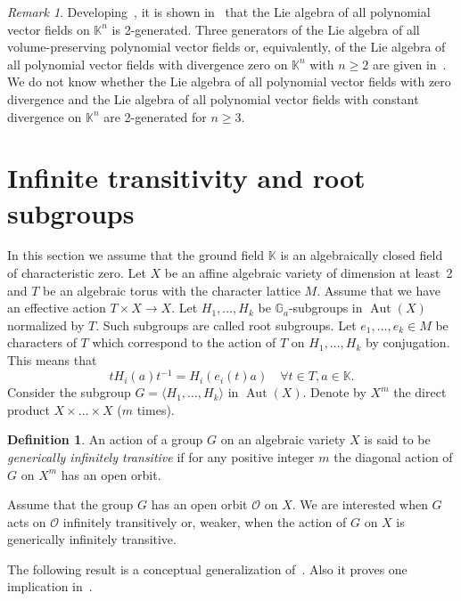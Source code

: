 \documentclass[a4paper,draft,reqno,12pt]{amsart}
\theoremstyle{definition}
\newtheorem{definition}[theorem]{Definition}
\theoremstyle{remark}
\newtheorem {remark}[theorem]{Remark}
\DeclareMathOperator{\Aut}{Aut}
\def\GG{{\mathbb G}}
\def\KK{{\mathbb K}}
\def\OOO{\mathcal{O}}
\renewcommand{\ge}{\geqslant}
\begin{document}
\begin{remark}
Developing~\cite[Theorem~11]{An-1}, it is shown in~\cite{Be} that the Lie algebra of all polynomial vector fields on $\KK^n$ is 2-generated. Three generators of the Lie algebra of all volume-preserving polynomial vector fields or, equivalently, of the Lie algebra of all polynomial vector fields with divergence zero on $\KK^n$ with $n\ge 2$ are given in~\cite[Theorem~14]{An-1}. We do not know whether the Lie algebra of all polynomial vector fields with zero divergence and the Lie algebra of all polynomial vector fields with constant divergence on $\KK^n$ are 2-generated for $n\ge 3$. 
\end{remark} 

\section{Infinite transitivity and root subgroups}
\label{sec3}

In this section we assume that the ground field $\KK$ is an algebraically closed field of characteristic zero. Let $X$ be an affine algebraic variety of dimension at least~2 and $T$
be an algebraic torus with the character lattice $M$. Assume that we have an effective action $T\times X\to X$. Let $H_1,\ldots, H_k$ be $\GG_a$-subgroups in $\Aut(X)$ normalized by $T$.
Such subgroups are called root subgroups. Let $e_1,\ldots,e_k\in M$ be characters of $T$ which correspond to the action of $T$ on $H_1,\ldots,H_k$ by conjugation. This means that
$$
tH_i(a)t^{-1}=H_i(e_i(t)a) \quad \forall t\in T, a\in\KK. 
$$
Consider the subgroup $G=\langle H_1,\ldots,H_k\rangle$ in $\Aut(X)$.  Denote by $X^m$ the direct product $X\times\ldots\times X$ ($m$ times). 

\begin{definition}
An action of a group $G$ on an algebraic variety $X$ is said to be \emph{generically infinitely transitive} if for any positive integer $m$ the diagonal action of $G$ on $X^m$ has an open orbit. 
\end{definition}

Assume that the group $G$ has an open orbit $\OOO$ on $X$. We are interested when $G$ acts on $\OOO$ infinitely transitively or, weaker, when the action of $G$ on $X$
is generically infinitely transitive. 

\smallskip

The following result is a conceptual generalization of~\cite[Remark~5.7]{AKZ}. Also it proves one implication in~\cite[Conjecture~2]{CT}. 
\end{document}
